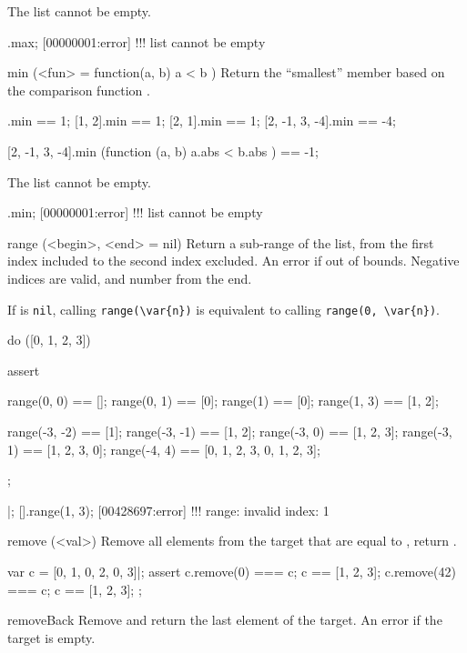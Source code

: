 \begin{urbiscriptapi}
The list cannot be empty.

\begin{urbiscript}
[].max;
[00000001:error] !!! list cannot be empty
\end{urbiscript}

\item[min](<fun> = function(a, b) { a < b })
  Return the ``smallest'' member based on the comparison function .
\begin{urbiassert}
           [1].min == 1;
        [1, 2].min == 1;
        [2, 1].min == 1;
[2, -1, 3, -4].min == -4;

[2, -1, 3, -4].min (function (a, b) { a.abs < b.abs }) == -1;
\end{urbiassert}

The list cannot be empty.

\begin{urbiscript}
[].min;
[00000001:error] !!! list cannot be empty
\end{urbiscript}

\item[range](<begin>, <end> = nil)
  Return a sub-range of the list, from the first index included to the
  second index excluded.  An error if out of bounds.  Negative indices
  are valid, and number from the end.

  If  is \lstinline|nil|, calling \lstinline|range(\var{n})|
  is equivalent to calling \lstinline|range(0, \var{n})|.

\begin{urbiscript}
do ([0, 1, 2, 3])
{
  assert
  {
    range(0, 0)   == [];
    range(0, 1)   == [0];
    range(1)      == [0];
    range(1, 3)   == [1, 2];

    range(-3, -2) == [1];
    range(-3, -1) == [1, 2];
    range(-3, 0)  == [1, 2, 3];
    range(-3, 1)  == [1, 2, 3, 0];
    range(-4, 4)  == [0, 1, 2, 3, 0, 1, 2, 3];
  };
}|;
[].range(1, 3);
[00428697:error] !!! range: invalid index: 1
\end{urbiscript}

\item[remove](<val>)%
  Remove all elements from the target that are equal to , return
  \this.

\begin{urbiscript}
var c = [0, 1, 0, 2, 0, 3]|;
assert
{
  c.remove(0) === c;   c ==  [1, 2, 3];
  c.remove(42) === c;  c ==  [1, 2, 3];
};
\end{urbiscript}

\item[removeBack]
  Remove and return the last element of the target. An error if the
  target is empty.


\end{urbiscriptapi}

